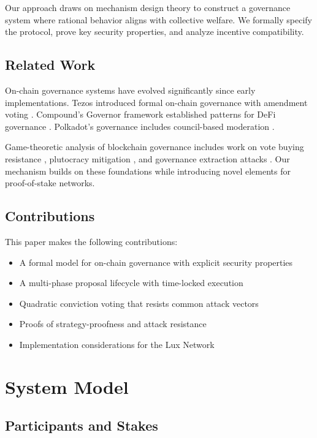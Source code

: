 \documentclass[11pt,a4paper]{article}
\theoremstyle{definition}
\theoremstyle{remark}
\begin{document}
Our approach draws on mechanism design theory to construct a governance system where rational behavior aligns with collective welfare. We formally specify the protocol, prove key security properties, and analyze incentive compatibility.

\subsection{Related Work}

On-chain governance systems have evolved significantly since early implementations. Tezos introduced formal on-chain governance with amendment voting \cite{goodman2014tezos}. Compound's Governor framework established patterns for DeFi governance \cite{compound2020governance}. Polkadot's governance includes council-based moderation \cite{wood2016polkadot}.

Game-theoretic analysis of blockchain governance includes work on vote buying resistance \cite{daian2018flashboys}, plutocracy mitigation \cite{buterin2018liberal}, and governance extraction attacks \cite{daian2020flash}. Our mechanism builds on these foundations while introducing novel elements for proof-of-stake networks.

\subsection{Contributions}

This paper makes the following contributions:
\begin{itemize}
    \item A formal model for on-chain governance with explicit security properties
    \item A multi-phase proposal lifecycle with time-locked execution
    \item Quadratic conviction voting that resists common attack vectors
    \item Proofs of strategy-proofness and attack resistance
    \item Implementation considerations for the Lux Network
\end{itemize}

\section{System Model}

\subsection{Participants and Stakes}
\end{document}
